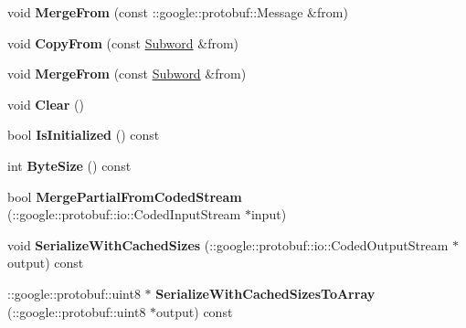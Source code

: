 \begin{DoxyCompactItemize}
\item 
\hypertarget{classlattice_1_1Subword_a9477c976f0289cea8423429c562b7d81}{
void {\bfseries MergeFrom} (const ::google::protobuf::Message \&from)}
\label{classlattice_1_1Subword_a9477c976f0289cea8423429c562b7d81}

\item 
\hypertarget{classlattice_1_1Subword_a433f5e66bd6cea31a3c63d0a74a95de4}{
void {\bfseries CopyFrom} (const \hyperlink{classlattice_1_1Subword}{Subword} \&from)}
\label{classlattice_1_1Subword_a433f5e66bd6cea31a3c63d0a74a95de4}

\item 
\hypertarget{classlattice_1_1Subword_af8f40895c8ae1ce04f617fedaa377192}{
void {\bfseries MergeFrom} (const \hyperlink{classlattice_1_1Subword}{Subword} \&from)}
\label{classlattice_1_1Subword_af8f40895c8ae1ce04f617fedaa377192}

\item 
\hypertarget{classlattice_1_1Subword_ab1072bac4c0bdeda3c448a40e89c9ed4}{
void {\bfseries Clear} ()}
\label{classlattice_1_1Subword_ab1072bac4c0bdeda3c448a40e89c9ed4}

\item 
\hypertarget{classlattice_1_1Subword_ae032c1b833fdfce330d0f185d3c08f97}{
bool {\bfseries IsInitialized} () const }
\label{classlattice_1_1Subword_ae032c1b833fdfce330d0f185d3c08f97}

\item 
\hypertarget{classlattice_1_1Subword_aa8d179aa2974c3c662c5790ca03148bd}{
int {\bfseries ByteSize} () const }
\label{classlattice_1_1Subword_aa8d179aa2974c3c662c5790ca03148bd}

\item 
\hypertarget{classlattice_1_1Subword_ade168b7ef9839ed60bc6a1fe33c6a5a2}{
bool {\bfseries MergePartialFromCodedStream} (::google::protobuf::io::CodedInputStream $\ast$input)}
\label{classlattice_1_1Subword_ade168b7ef9839ed60bc6a1fe33c6a5a2}

\item 
\hypertarget{classlattice_1_1Subword_ab8c9ea5fadefc35219ce39839adbf303}{
void {\bfseries SerializeWithCachedSizes} (::google::protobuf::io::CodedOutputStream $\ast$output) const }
\label{classlattice_1_1Subword_ab8c9ea5fadefc35219ce39839adbf303}

\item 
\hypertarget{classlattice_1_1Subword_a39725b39e07a08dff2225fa1f4115e40}{
::google::protobuf::uint8 $\ast$ {\bfseries SerializeWithCachedSizesToArray} (::google::protobuf::uint8 $\ast$output) const }
\label{classlattice_1_1Subword_a39725b39e07a08dff2225fa1f4115e40}


\end{DoxyCompactItemize}
